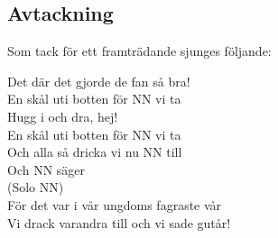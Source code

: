 \begin{flushleft}
\section{Avtackning}
\end{flushleft}
{\large
Som tack för ett framträdande sjunges följande:

\begin{flushleft}
Det där det gjorde de fan så bra!\\
En skål uti botten för NN vi ta\\
\repopen Hugg i och dra, hej! \repclose\\
En skål uti botten för NN vi ta\\
Och alla så dricka vi nu NN till\\
Och NN säger\\
(Solo NN)\\
För det var i vår ungdoms fagraste vår\\
Vi drack varandra till och vi sade gutår!\\
\end{flushleft}
}




